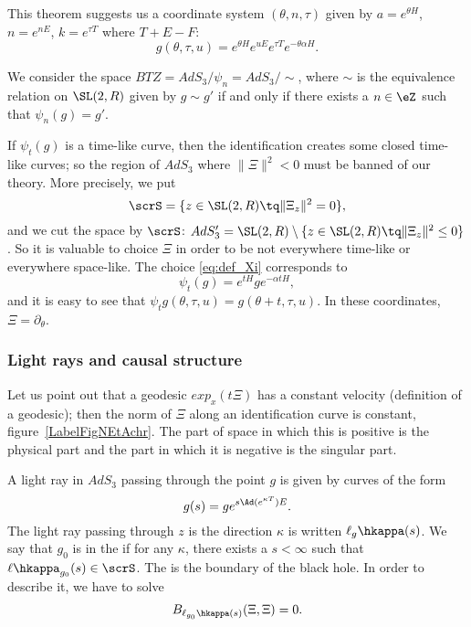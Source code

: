 This theorem suggests us a coordinate system $(\theta,n,\tau)$ given by $a=e^{\theta H}$, $n=e^{n E}$, $k=e^{\tau T}$ where $T+E-F$:
\[
g(\theta,\tau,u)=e^{\theta H}e^{uE}e^{\tau T}e^{-\theta\alpha H}.
\]

We consider the space $BTZ=AdS_3/\psi_n=AdS_3/\sim$, where $\sim$ is the equivalence relation on $\SL(2,R)$ given by $g\sim g'$ if and only if there exists a $n\in\eZ$ such that $\psi_n(g)=g'$.

If $\psi_t(g)$ is a time-like curve, then the identification creates some closed time-like curves; so the region of $AdS_3$ where $\|\Xi\|^2<0$ must be banned of our theory. More precisely, we put
\[
\scrS=\{z\in\SL(2,R)\tq \|\Xi_z\|^2=0\},
\]
and we cut the space by $\scrS$: $AdS_3'=\SL(2,R)\setminus \{z\in\SL(2,R)\tq \|\Xi_z\|^2\leq 0\}$. So it is valuable to choice $\Xi$ in order to be not everywhere time-like or everywhere space-like. The choice \eqref{eq:def_Xi} corresponds to
\begin{equation}
\psi_t(g)=e^{tH}ge^{-\alpha tH},
\end{equation}
and it is easy to see that $\psi_tg(\theta,\tau,u)=g(\theta+t,\tau,u)$. In these coordinates, $\Xi=\partial_{\theta}$.

\subsubsection{Light rays and causal structure}

Let us point out that a geodesic $exp_x(t\Xi)$ has a constant velocity (definition of a geodesic); then the norm of $\Xi$ along an identification curve is constant, figure~\ref{LabelFigNEtAchr}. The part of space in which this is positive is the physical part and the part in which it is negative is the singular part.

\newcommand{\CaptionFigNEtAchr}{The norm (in particular its sing) of \( \Xi\) is contant along a geodesic.}


A light ray in $AdS_3$ passing through the point $g$ is given by curves of the form
\begin{equation}
 g(s)=ge^{s\Ad(e^{\kappa T})E}.
\end{equation}
The light ray passing through $z$ is the direction $\kappa$ is written $\ell_g\hkappa(s)$. We say that $g_0$ is in the  if for any $\kappa$, there exists a $s<\infty$ such that $\ell\hkappa_{g_0}(s)\in\scrS$. The  is the boundary of the black hole. In order to describe it, we have to solve
\begin{equation}
 B_{\ell_{g_0}\hkappa(s)}(\Xi,\Xi)=0.
\end{equation}
